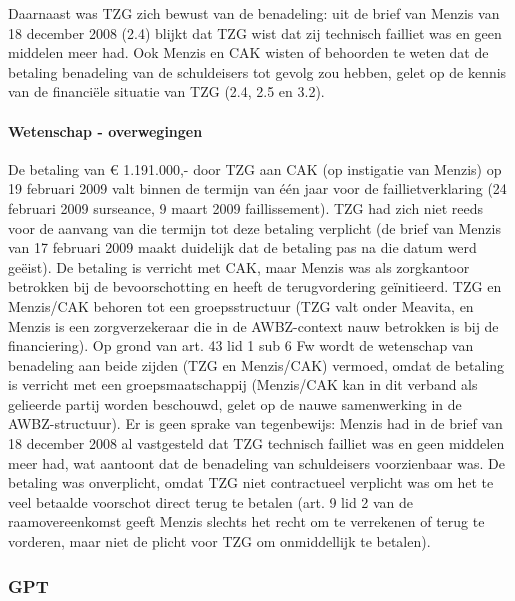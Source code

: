 \documentclass[
  dutch,
  a4paper,
]{article}
\begin{document}
Daarnaast was TZG zich bewust van de benadeling: uit de brief van Menzis van 18 december 2008 (2.4) blijkt dat TZG wist dat zij technisch failliet was en geen middelen meer had. Ook Menzis en CAK wisten of behoorden te weten dat de betaling benadeling van de schuldeisers tot gevolg zou hebben, gelet op de kennis van de financiële situatie van TZG (2.4, 2.5 en 3.2).

\paragraph{Wetenschap - overwegingen}\label{wetenschap---overwegingen-84}

De betaling van € 1.191.000,- door TZG aan CAK (op instigatie van Menzis) op 19 februari 2009 valt binnen de termijn van één jaar voor de faillietverklaring (24 februari 2009 surseance, 9 maart 2009 faillissement). TZG had zich niet reeds voor de aanvang van die termijn tot deze betaling verplicht (de brief van Menzis van 17 februari 2009 maakt duidelijk dat de betaling pas na die datum werd geëist). De betaling is verricht met CAK, maar Menzis was als zorgkantoor betrokken bij de bevoorschotting en heeft de terugvordering geïnitieerd. TZG en Menzis/CAK behoren tot een groepsstructuur (TZG valt onder Meavita, en Menzis is een zorgverzekeraar die in de AWBZ-context nauw betrokken is bij de financiering). Op grond van art. 43 lid 1 sub 6 Fw wordt de wetenschap van benadeling aan beide zijden (TZG en Menzis/CAK) vermoed, omdat de betaling is verricht met een groepsmaatschappij (Menzis/CAK kan in dit verband als gelieerde partij worden beschouwd, gelet op de nauwe samenwerking in de AWBZ-structuur). Er is geen sprake van tegenbewijs: Menzis had in de brief van 18 december 2008 al vastgesteld dat TZG technisch failliet was en geen middelen meer had, wat aantoont dat de benadeling van schuldeisers voorzienbaar was. De betaling was onverplicht, omdat TZG niet contractueel verplicht was om het te veel betaalde voorschot direct terug te betalen (art. 9 lid 2 van de raamovereenkomst geeft Menzis slechts het recht om te verrekenen of terug te vorderen, maar niet de plicht voor TZG om onmiddellijk te betalen).

\newpage


\subsubsection{GPT}\label{gpt-28}
\end{document}
